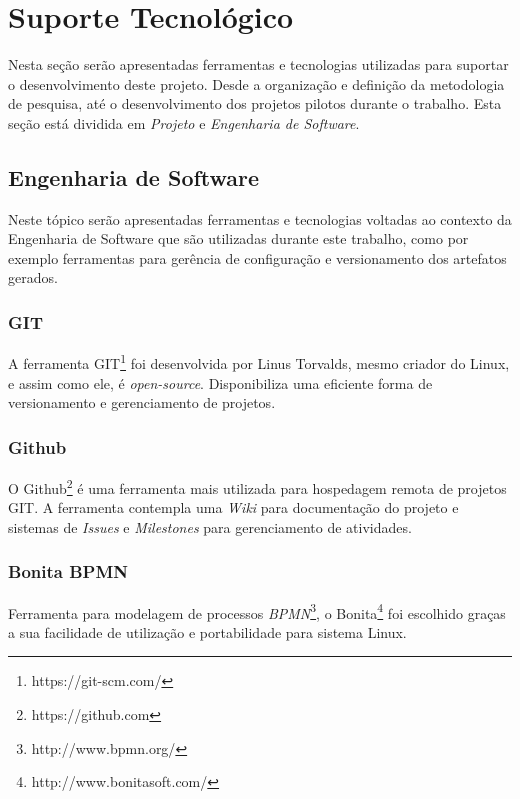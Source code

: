 
\chapter[Suporte Tecnológico]{Suporte Tecnológico}

Nesta seção serão apresentadas ferramentas e tecnologias utilizadas para suportar o desenvolvimento deste projeto. Desde a organização e definição da metodologia de pesquisa, até o desenvolvimento dos projetos pilotos durante o trabalho. Esta seção está dividida em \textit{Projeto} e \textit{Engenharia de Software}.

\section{Engenharia de Software} %
\label{sec:engenharia_de_software}
	Neste tópico serão apresentadas ferramentas e tecnologias voltadas ao contexto da Engenharia de Software que são utilizadas durante este trabalho, como por exemplo ferramentas para gerência de configuração e versionamento dos artefatos gerados.

	\subsection{GIT} %
	\label{sub:git}
	
		A ferramenta GIT\footnote{https://git-scm.com/} foi desenvolvida por Linus Torvalds, mesmo criador do Linux, e assim como ele, é \textit{open-source}. Disponibiliza uma eficiente forma de versionamento e gerenciamento de projetos. 

	\subsection{Github} %
	\label{sub:github}
		O Github\footnote{https://github.com} é uma ferramenta mais utilizada para hospedagem remota de projetos GIT. A ferramenta contempla uma \textit{Wiki} para documentação do projeto e sistemas de \textit{Issues} e \textit{Milestones} para gerenciamento de atividades.

	\subsection{Bonita BPMN} %
	\label{sub:bonita_bpmn}
		Ferramenta para modelagem de processos \textit{BPMN}\footnote{http://www.bpmn.org/}, o Bonita\footnote{http://www.bonitasoft.com/} foi escolhido graças a sua facilidade de utilização e portabilidade para sistema Linux.

